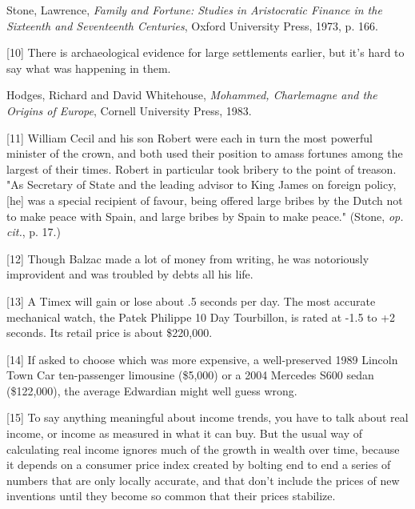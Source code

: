 Stone,
                  Lawrence,
                  \emph{Family and Fortune: Studies in Aristocratic Finance in the
                    Sixteenth and Seventeenth Centuries}, Oxford University Press, 1973, p. 166.

[10] There is archaeological evidence for large settlements
                  earlier, but it's hard to say what was happening in them.

Hodges,
                  Richard and David Whitehouse,
                  \emph{Mohammed, Charlemagne and the Origins of Europe},
                  Cornell University Press, 1983.

[11] William Cecil and his son Robert were each in turn the most
                  powerful minister of the crown, and both used their position
                  to amass fortunes among the largest of their times. Robert in
                  particular took bribery to the point of treason. "As Secretary
                  of State and the leading advisor to King James on foreign
                  policy, [he] was a special recipient of favour, being offered
                  large bribes by the Dutch not to make peace with Spain, and
                  large bribes by Spain to make peace." (Stone, \emph{op. cit.},
                  p. 17.)

[12] Though Balzac made a lot of money from writing, he was
                  notoriously improvident and was troubled by debts all his
                  life.

[13] A Timex will gain or lose about .5 seconds per day. The
                  most accurate mechanical watch, the Patek Philippe 10 Day
                  Tourbillon, is rated at -1.5 to +2 seconds. Its retail price
                  is about \$220,000.

[14] If asked to choose which was more expensive, a
                  well-preserved 1989 Lincoln Town Car ten-passenger limousine
                  (\$5,000) or a 2004 Mercedes S600 sedan (\$122,000), the average
                  Edwardian might well guess wrong.

[15] To say anything meaningful about income trends, you have to
                  talk about real income, or income as measured in what it can
                  buy. But the usual way of calculating real income ignores much
                  of the growth in wealth over time, because it depends on a
                  consumer price index created by bolting end to end a series of
                  numbers that are only locally accurate, and that don't include
                  the prices of new inventions until they become so common that
                  their prices stabilize.

